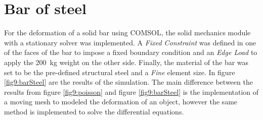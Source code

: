 \documentclass[main.tex]{subfiles}
\begin{document}


\newpage

\section{Bar of steel}

For the deformation of a solid bar using COMSOL, the solid mechanics module with a stationary solver was implemented.
A \textit{Fixed Constraint} was defined in one of the faces of the bar to impose a fixed boundary condition and an \textit{Edge Load} to apply the \SI{200}{\kilo\gram} weight on the other side.
Finally, the material of the bar was set to be the pre-defined structural steel and a \textit{Fine} element size.
In figure \ref{fig9:barSteel} are the results of the simulation.
The main difference between the results from figure \ref{fig9:poisson} and figure \ref{fig9:barSteel} is the implementation of a moving mesh to modeled the deformation of an object, however the same method is implemented to solve the differential equations.
\end{document}
